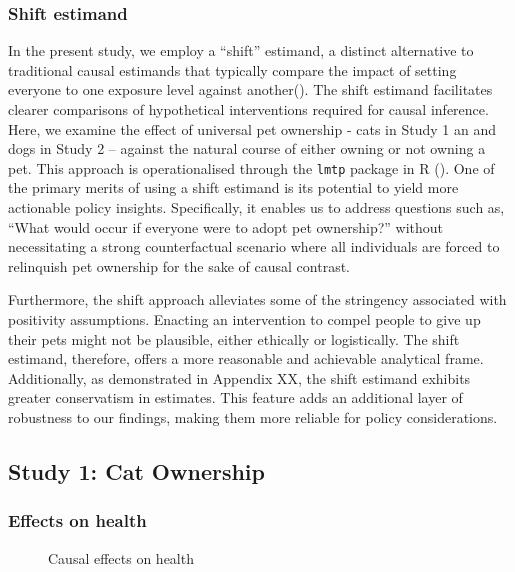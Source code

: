 \documentclass[
  singlecolumn,
  9pt]{article}
\begin{document}
\subsubsection{Shift estimand}\label{shift-estimand}

In the present study, we employ a ``shift'' estimand, a distinct
alternative to traditional causal estimands that typically compare the
impact of setting everyone to one exposure level against
another(). The shift
estimand facilitates clearer comparisons of hypothetical interventions
required for causal inference. Here, we examine the effect of universal
pet ownership - cats in Study 1 an and dogs in Study 2 -- against the
natural course of either owning or not owning a pet. This approach is
operationalised through the \texttt{lmtp} package in R
(). One of the
primary merits of using a shift estimand is its potential to yield more
actionable policy insights. Specifically, it enables us to address
questions such as, ``What would occur if everyone were to adopt pet
ownership?'' without necessitating a strong counterfactual scenario
where all individuals are forced to relinquish pet ownership for the
sake of causal contrast.

Furthermore, the shift approach alleviates some of the stringency
associated with positivity assumptions. Enacting an intervention to
compel people to give up their pets might not be plausible, either
ethically or logistically. The shift estimand, therefore, offers a more
reasonable and achievable analytical frame. Additionally, as
demonstrated in Appendix XX, the shift estimand exhibits greater
conservatism in estimates. This feature adds an additional layer of
robustness to our findings, making them more reliable for policy
considerations.

\newpage{}

\subsection{Study 1: Cat Ownership}\label{study-1-cat-ownership}

\subsubsection{Effects on health}\label{effects-on-health}

\begin{figure}


\caption{\label{fig-results-health-cats}Causal effects on health}

\end{figure}%
\end{document}
